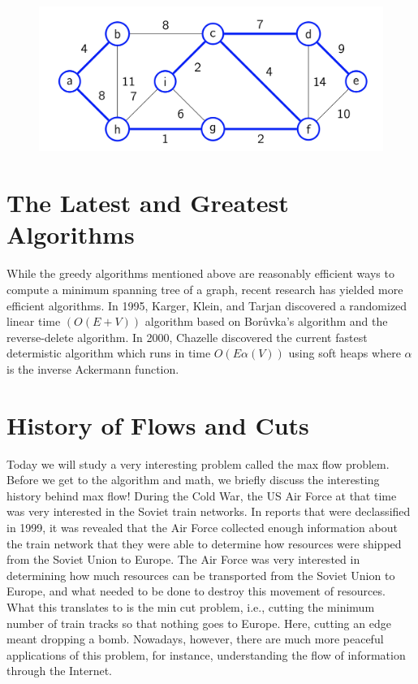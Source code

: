 \documentclass [12pt]{article}
\theoremstyle{definition}
\begin{document}
\begin{figure}[h!]
\centering
\includegraphics[scale=0.8]{kruskal8.png}
\caption{}
\label{fig:kruskal8}
\end{figure}


\section{The Latest and Greatest Algorithms}
 
While the greedy algorithms mentioned above are reasonably efficient ways to compute a minimum spanning tree of a graph, recent research has yielded more efficient algorithms. In 1995, Karger, Klein, and Tarjan discovered a randomized linear time $(O(E + V ))$ algorithm based on Borůvka's algorithm and the reverse-delete algorithm. In 2000, Chazelle discovered the current fastest determistic algorithm which runs in time $O(E \alpha(V ))$ using soft heaps where $\alpha$ is the inverse Ackermann function.


\section{History of Flows and Cuts}

Today we will study a very interesting problem called the max flow problem. Before we get to the algorithm and math, we briefly discuss the interesting history behind max flow! During the Cold War, the US Air Force at that time was very interested in the Soviet train networks. In reports that were declassified in 1999, it was revealed that the Air Force collected enough information about the train network that they were able to determine how resources were shipped from the Soviet Union to Europe. The Air Force was very interested in determining how much resources can be transported from the Soviet Union to Europe, and what needed to be done to destroy this movement of resources. What this translates to is the min cut problem, i.e., cutting the minimum number of train tracks so that nothing goes to Europe. Here, cutting an edge meant dropping a bomb. Nowadays, however, there are much more peaceful applications of this problem, for instance, understanding the flow of information through the Internet.
\end{document}
